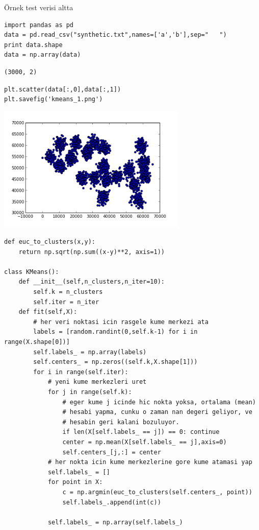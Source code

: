 \documentclass[12pt,fleqn]{article}\usepackage{../../common}
\begin{document}
Örnek test verisi altta

\begin{verbatim}
import pandas as pd
data = pd.read_csv("synthetic.txt",names=['a','b'],sep="   ")
print data.shape
data = np.array(data)
\end{verbatim}

\begin{verbatim}
(3000, 2)
\end{verbatim}

\begin{verbatim}
plt.scatter(data[:,0],data[:,1])
plt.savefig('kmeans_1.png')
\end{verbatim}

\includegraphics[height=6cm]{kmeans_1.png}
\begin{verbatim}
def euc_to_clusters(x,y):
    return np.sqrt(np.sum((x-y)**2, axis=1))

class KMeans():
    def __init__(self,n_clusters,n_iter=10):
        self.k = n_clusters
        self.iter = n_iter
    def fit(self,X):
        # her veri noktasi icin rasgele kume merkezi ata
        labels = [random.randint(0,self.k-1) for i in range(X.shape[0])]
        self.labels_ = np.array(labels)
        self.centers_ = np.zeros((self.k,X.shape[1]))
        for i in range(self.iter):
            # yeni kume merkezleri uret
            for j in range(self.k):
                # eger kume j icinde hic nokta yoksa, ortalama (mean)
                # hesabi yapma, cunku o zaman nan degeri geliyor, ve
                # hesabin geri kalani bozuluyor.
                if len(X[self.labels_ == j]) == 0: continue
                center = np.mean(X[self.labels_ == j],axis=0)
                self.centers_[j,:] = center
            # her nokta icin kume merkezlerine gore kume atamasi yap
            self.labels_ = []
            for point in X:
                c = np.argmin(euc_to_clusters(self.centers_, point))
                self.labels_.append(int(c))

            self.labels_ = np.array(self.labels_)
\end{verbatim}
\end{document}
